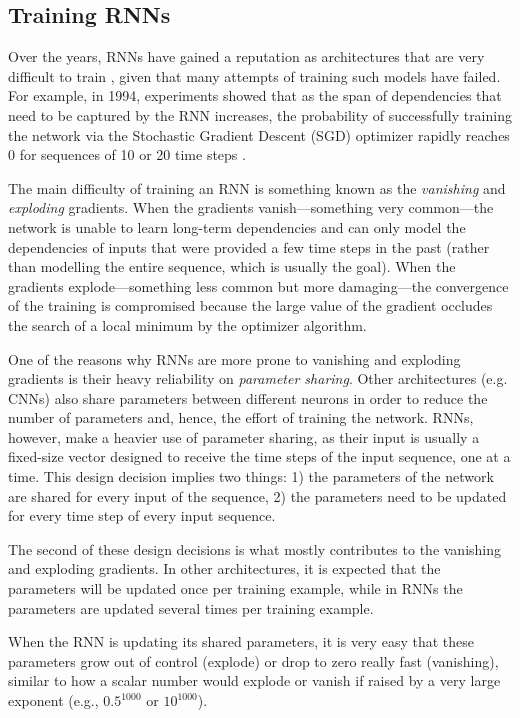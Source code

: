 \subsection{Training RNNs}

Over the years, RNNs have gained a reputation as architectures that are very difficult to train \cite{pascanu_difficulty_2013}, given that many attempts of training such models have failed. For example, in 1994, experiments showed that as the span of dependencies that need to be captured by the RNN increases, the probability of successfully training the network via the Stochastic Gradient Descent (SGD) optimizer rapidly reaches 0 for sequences of 10 or 20 time steps \cite{bengio_learning_1994}. 

The main difficulty of training an RNN is something known as the \emph{vanishing} and \emph{exploding} gradients. When the gradients vanish---something very common---the network is unable to learn long-term dependencies and can only model the dependencies of inputs that were provided a few time steps in the past (rather than modelling the entire sequence, which is usually the goal). When the gradients explode---something less common but more damaging---the convergence of the training is compromised because the large value of the gradient occludes the search of a local minimum by the optimizer algorithm.

One of the reasons why RNNs are more prone to vanishing and exploding gradients is their heavy reliability on \emph{parameter sharing}. Other architectures (e.g. CNNs) also share parameters between different neurons in order to reduce the number of parameters and, hence, the effort of training the network. RNNs, however, make a heavier use of parameter sharing, as their input is usually a fixed-size vector designed to receive the time steps of the input sequence, one at a time. This design decision implies two things: 1) the parameters of the network are shared for every input of the sequence, 2) the parameters need to be updated for every time step of every input sequence.

The second of these design decisions is what mostly contributes to the vanishing and exploding gradients. In other architectures, it is expected that the parameters will be updated once per training example, while in RNNs the parameters are updated several times per training example. 

When the RNN is updating its shared parameters, it is very easy that these parameters grow out of control (explode) or drop to zero really fast (vanishing), similar to how a scalar number would explode or vanish if raised by a very large exponent (e.g., $0.5^{1000}$ or $10^{1000}$).

